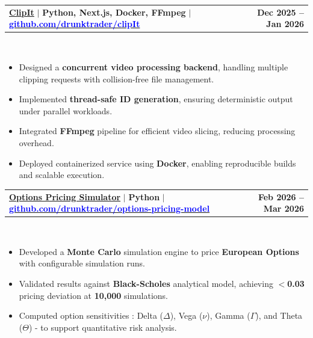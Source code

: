 \documentclass[letterpaper,10pt]{article}
\makeatletter
\newcommand{\resumeItem}[1]{
  \item\small{
    {#1 \vspace{-5pt}}
  }
}
\newcommand{\resumeProjectHeading}[2]{
    \item
    \begin{tabular*}{1.001\textwidth}{l@{\extracolsep{\fill}}r}
      \small#1 & \textbf{\small #2}\\
    \end{tabular*}\vspace{-12pt}
}
\newcommand{\resumeItemListStart}{\begin{itemize}}
\newcommand{\resumeItemListEnd}{\end{itemize}\vspace{-5pt}}
\makeatother
\begin{document}
    \resumeProjectHeading
    {\textbf{\normalsize{\underline{ClipIt}}} $|$ \footnotesize{\textbf{Python, Next.js, Docker, FFmpeg}} $|$ \href{https://github.com/DrunkTrader/clipIt}{\textcolor{blue}{\textbf{github.com/drunktrader/clipIt}}}}{Dec 2025 -- Jan 2026}\\
  \vspace{8pt}
  \resumeItemListStart
      \resumeItem{Designed a \textbf{concurrent video processing backend}, handling multiple clipping requests with collision-free file management.}
      \vspace{2pt}
      \resumeItem{Implemented \textbf{thread-safe ID generation}, ensuring deterministic output under parallel workloads.}
      \vspace{2pt}
      \resumeItem{Integrated \textbf{FFmpeg} pipeline for efficient video slicing, reducing processing overhead.}
      \vspace{2pt}
      \resumeItem{Deployed containerized service using \textbf{Docker}, enabling reproducible builds and scalable execution.}
      \vspace{2pt}
    \resumeItemListEnd
    \vspace{-6pt}

    \resumeProjectHeading
    {\textbf{\normalsize{\underline{Options Pricing Simulator}}} $|$ \footnotesize{\textbf{Python}} $|$ \href{https://github.com/drunktrader/options-pricing-model}{\textcolor{blue}{\textbf{github.com/drunktrader/options-pricing-model}}}}{Feb 2026 -- Mar 2026}\\
    \vspace{8pt}
    \resumeItemListStart
        \resumeItem {Developed a \textbf{Monte Carlo} simulation engine to price \textbf{European Options} with configurable simulation runs.}
        \vspace{2pt}
        \resumeItem{Validated results against \textbf{Black-Scholes} analytical model, achieving \textbf{$<$0.03} pricing deviation at \textbf{10,000} simulations.}
        \vspace{2pt}
        \resumeItem{Computed option sensitivities : Delta ($\Delta$), Vega ($\nu$), Gamma ($\Gamma$), and Theta ($\Theta$) - to support quantitative risk analysis.}
        \vspace{2pt}    
    \resumeItemListEnd 
    \vspace{-6pt}
\end{document}

